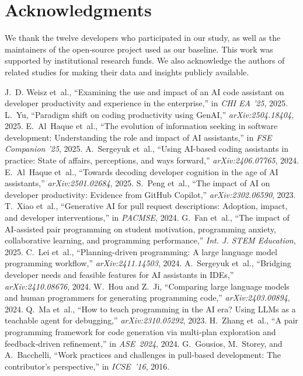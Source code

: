 \documentclass[conference]{IEEEtran}
\begin{document}
\section*{Acknowledgments}
We thank the twelve developers who participated in our study, as well as the maintainers of the open‑source project used as our baseline.  This work was supported by institutional research funds.  We also acknowledge the authors of related studies for making their data and insights publicly available.

\begin{thebibliography}{99}
 J.~D. Weisz et~al., “Examining the use and impact of an AI code assistant on developer productivity and experience in the enterprise,” in \emph{CHI EA ’25}, 2025.
 L.~Yu, “Paradigm shift on coding productivity using GenAI,” \emph{arXiv:2504.18404}, 2025.
 E.~Al~Haque et~al., “The evolution of information seeking in software development: Understanding the role and impact of AI assistants,” in \emph{FSE Companion ’25}, 2025.
 A.~Sergeyuk et~al., “Using AI-based coding assistants in practice: State of affairs, perceptions, and ways forward,” \emph{arXiv:2406.07765}, 2024.
 E.~Al~Haque et~al., “Towards decoding developer cognition in the age of AI assistants,” \emph{arXiv:2501.02684}, 2025.
 S.~Peng et~al., “The impact of AI on developer productivity: Evidence from GitHub Copilot,” \emph{arXiv:2302.06590}, 2023.
 T.~Xiao et~al., “Generative AI for pull request descriptions: Adoption, impact, and developer interventions,” in \emph{PACMSE}, 2024.
 G.~Fan et~al., “The impact of AI-assisted pair programming on student motivation, programming anxiety, collaborative learning, and programming performance,” \emph{Int. J. STEM Education}, 2025.
 C.~Lei et~al., “Planning-driven programming: A large language model programming workflow,” \emph{arXiv:2411.14503}, 2024.
 A.~Sergeyuk et~al., “Bridging developer needs and feasible features for AI assistants in IDEs,” \emph{arXiv:2410.08676}, 2024.
 W.~Hou and Z.~Ji, “Comparing large language models and human programmers for generating programming code,” \emph{arXiv:2403.00894}, 2024.
 Q.~Ma et~al., “How to teach programming in the AI era? Using LLMs as a teachable agent for debugging,” \emph{arXiv:2310.05292}, 2023.
 H.~Zhang et al., “A pair programming framework for code generation via multi‑plan exploration and feedback‑driven refinement,” in \emph{ASE 2024}, 2024.
 G.~Gousios, M.~Storey, and A.~Bacchelli, “Work practices and challenges in pull‑based development: The contributor’s perspective,” in \emph{ICSE ’16}, 2016.
\end{thebibliography}
\end{document}

